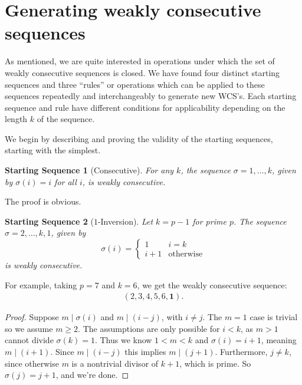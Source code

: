 \documentclass{article}
\newtheorem{startseq}{Starting Sequence}
\theoremstyle{definition}
\theoremstyle{remark}
\numberwithin{equation}{section}
\numberwithin{case}{theorem}
\begin{document}
\section{Generating weakly consecutive sequences} \label{sec:rules}

As mentioned, we are quite interested in operations under which the set of weakly consecutive sequences is closed. We have found four distinct starting sequences and three ``rules'' or operations which can be applied to these sequences repeatedly and interchangeably to generate new WCS's. Each starting sequence and rule have different conditions for applicability depending on the length $k$ of the sequence.

We begin by describing and proving the validity of the starting sequences, starting with the simplest.
\begin{startseq}[Consecutive] \label{start:consecutive}
    For any $k$, the sequence $\sigma = 1,\dots, k$, given by $\sigma(i)=i$ for all $i$, is weakly consecutive.
\end{startseq}

The proof is obvious.


\begin{startseq}[$1$-Inversion] \label{start:nontriv}
    Let $k=p-1$ for prime $p$. The sequence $\sigma = 2,\dots, k, 1$, given by 
    $$\sigma(i) = \begin{cases} 
          1 & i = k \\
          i+1 & \text{otherwise}
       \end{cases}$$
    is weakly consecutive.
\end{startseq}
For example, taking $p = 7$ and $k=6$, we get the weakly consecutive sequence:
\begin{gather*}
    (2,3,4,5,6,\mathbf{1}).
\end{gather*}

\begin{proof}
    Suppose $m \mid \sigma(i)$ and $m \mid (i - j)$, with $i \neq j$. The $m=1$ case is trivial so we assume $m \geq 2$. The assumptions are only possible for $i < k$, as $m > 1$ cannot divide $\sigma(k) = 1$. Thus we know $1 < m < k$ and $\sigma(i) = i + 1$, meaning $m \mid (i+1)$. Since $m \mid (i-j)$ this implies $m \mid (j+1)$. Furthermore, $j \neq k$, since otherwise $m$ is a nontrivial divisor of $k+1$, which is prime. So $\sigma(j) = j+1$, and we're done. 
\end{proof}

\end{document}
